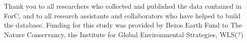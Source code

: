 \documentclass[, manuscript]{copernicus}
\begin{document}

\begin{acknowledgements}
Thank you to all researchers who collected and published the data
contained in ForC, and to all research assistants and collaborators who
have helped to build the database. Funding for this study was provided
by Bezos Earth Fund to The Nature Conservancy, the Institute for Global
Environmental Strategies, WLS(?)
\end{acknowledgements}







\end{document}
